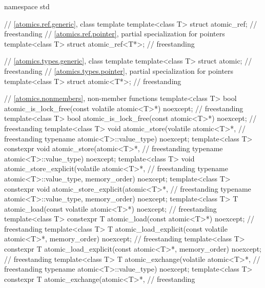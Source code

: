 \begin{codeblock}
namespace std {
  // \ref{atomics.ref.generic}, class template 
  template<class T> struct atomic_ref;                                              // freestanding
  // \ref{atomics.ref.pointer}, partial specialization for pointers
  template<class T> struct atomic_ref<T*>;                                          // freestanding

  // \ref{atomics.types.generic}, class template 
  template<class T> struct atomic;                                                  // freestanding
  // \ref{atomics.types.pointer}, partial specialization for pointers
  template<class T> struct atomic<T*>;                                              // freestanding

  // \ref{atomics.nonmembers}, non-member functions
  template<class T>
    bool atomic_is_lock_free(const volatile atomic<T>*) noexcept;                   // freestanding
  template<class T>
    bool atomic_is_lock_free(const atomic<T>*) noexcept;                            // freestanding
  template<class T>
    void atomic_store(volatile atomic<T>*,                                          // freestanding
                      typename atomic<T>::value_type) noexcept;
  template<class T>
    constexpr void atomic_store(atomic<T>*,                                         // freestanding
                                typename atomic<T>::value_type) noexcept;
  template<class T>
    void atomic_store_explicit(volatile atomic<T>*,                                 // freestanding
                               typename atomic<T>::value_type, memory_order) noexcept;
  template<class T>
    constexpr void atomic_store_explicit(atomic<T>*,                                // freestanding
                                         typename atomic<T>::value_type, memory_order) noexcept;
  template<class T>
    T atomic_load(const volatile atomic<T>*) noexcept;                              // freestanding
  template<class T>
    constexpr T atomic_load(const atomic<T>*) noexcept;                             // freestanding
  template<class T>
    T atomic_load_explicit(const volatile atomic<T>*, memory_order) noexcept;       // freestanding
  template<class T>
    constexpr T atomic_load_explicit(const atomic<T>*, memory_order) noexcept;      // freestanding
  template<class T>
    T atomic_exchange(volatile atomic<T>*,                                          // freestanding
                      typename atomic<T>::value_type) noexcept;
  template<class T>
    constexpr T atomic_exchange(atomic<T>*,                                         // freestanding
}
\end{codeblock}
